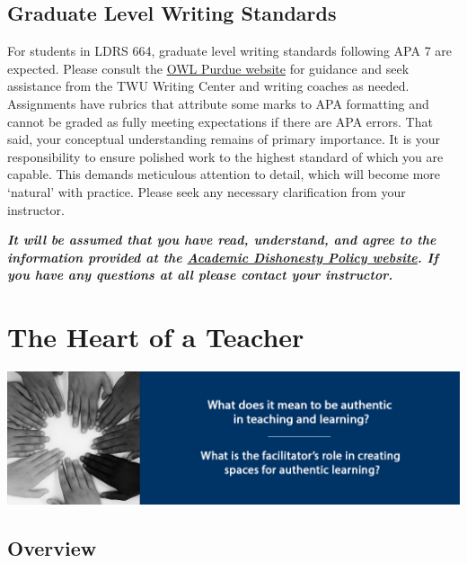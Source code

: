 \documentclass[
]{book}
\begin{document}
\hypertarget{graduate-level-writing-standards}{%
\section*{Graduate Level Writing Standards}\label{graduate-level-writing-standards}}

For students in LDRS 664, graduate level writing standards following APA 7 are expected. Please consult the \href{https://owl.purdue.edu/owl/research_and_citation/apa_style/apa_style_introduction.html}{OWL Purdue website} for guidance and seek assistance from the TWU Writing Center and writing coaches as needed. Assignments have rubrics that attribute some marks to APA formatting and cannot be graded as fully meeting expectations if there are APA errors. That said, your conceptual understanding remains of primary importance. It is your responsibility to ensure polished work to the highest standard of which you are capable. This demands meticulous attention to detail, which will become more `natural' with practice. Please seek any necessary clarification from your instructor.

\begin{caution}
\textbf{\emph{It will be assumed that you have read, understand, and agree to the information provided at the \href{https://www.twu.ca/about-us/policies-guidelines/university-policies/academic-misconduct-fraud}{Academic Dishonesty Policy website}. If you have any questions at all please contact your instructor.}}
\end{caution}

\hypertarget{the-heart-of-a-teacher}{%
\chapter{The Heart of a Teacher}\label{the-heart-of-a-teacher}}

\includegraphics{assets/unit1/LDRS664-BannerUnit1.jpg}

\hypertarget{overview}{%
\section*{Overview}\label{overview}}
\end{document}
